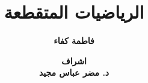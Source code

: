 


	\title{الرياضيات المتقطعة}
	\author{\textbf{فاطمة كفاء}}
	\date{\textbf{
اشراف \\
د. مضر عباس مجيد}}

\begin{frame}
	\maketitle
\end{frame}
